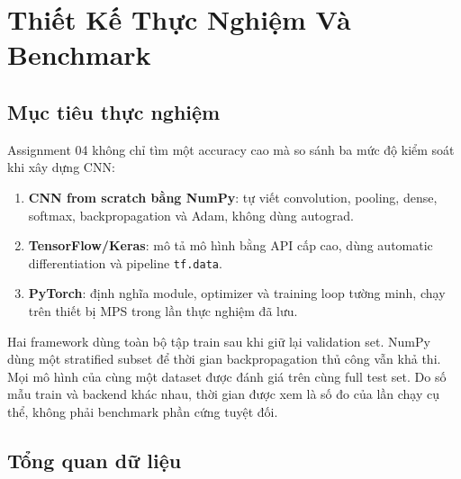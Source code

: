 \documentclass[12pt,a4paper]{report}
\begin{document}
\chapter{Thiết Kế Thực Nghiệm Và Benchmark}

\section{Mục tiêu thực nghiệm}
Assignment 04 không chỉ tìm một accuracy cao mà so sánh ba mức độ kiểm soát khi xây dựng CNN:
\begin{enumerate}
    \item \textbf{CNN from scratch bằng NumPy}: tự viết convolution, pooling, dense, softmax, backpropagation và Adam, không dùng autograd.
    \item \textbf{TensorFlow/Keras}: mô tả mô hình bằng API cấp cao, dùng automatic differentiation và pipeline \texttt{tf.data}.
    \item \textbf{PyTorch}: định nghĩa module, optimizer và training loop tường minh, chạy trên thiết bị MPS trong lần thực nghiệm đã lưu.
\end{enumerate}

Hai framework dùng toàn bộ tập train sau khi giữ lại validation set.
NumPy dùng một stratified subset để thời gian backpropagation thủ công vẫn khả thi.
Mọi mô hình của cùng một dataset được đánh giá trên cùng full test set.
Do số mẫu train và backend khác nhau, thời gian được xem là số đo của lần chạy cụ thể, không phải benchmark phần cứng tuyệt đối.

\section{Tổng quan dữ liệu}
\begin{table}[H]
\centering
\caption{Tổng quan hai bộ dữ liệu của Assignment 04}
\label{tab:dataset_overview}
\end{table}
\end{document}
